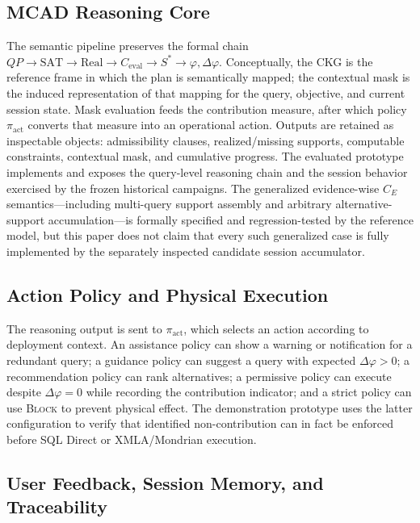\documentclass[journal]{IEEEtran}
\begin{document}
\subsection{MCAD Reasoning Core}

The semantic pipeline preserves the formal chain $QP\rightarrow\mathrm{SAT}\rightarrow\mathrm{Real}\rightarrow C_{\mathrm{eval}}\rightarrow S^*\rightarrow\varphi,\Delta\varphi$. Conceptually, the CKG is the reference frame in which the plan is semantically mapped; the contextual mask is the induced representation of that mapping for the query, objective, and current session state. Mask evaluation feeds the contribution measure, after which policy $\pi_{\mathrm{act}}$ converts that measure into an operational action. Outputs are retained as inspectable objects: admissibility clauses, realized/missing supports, computable constraints, contextual mask, and cumulative progress. The evaluated prototype implements and exposes the query-level reasoning chain and the session behavior exercised by the frozen historical campaigns. The generalized evidence-wise $C_E$ semantics---including multi-query support assembly and arbitrary alternative-support accumulation---is formally specified and regression-tested by the reference model, but this paper does not claim that every such generalized case is fully implemented by the separately inspected candidate session accumulator.



\subsection{Action Policy and Physical Execution}

The reasoning output is sent to $\pi_{\mathrm{act}}$, which selects an action according to deployment context. An assistance policy can show a warning or notification for a redundant query; a guidance policy can suggest a query with expected $\Delta\varphi>0$; a recommendation policy can rank alternatives; a permissive policy can execute despite $\Delta\varphi=0$ while recording the contribution indicator; and a strict policy can use \textsc{Block} to prevent physical effect. The demonstration prototype uses the latter configuration to verify that identified non-contribution can in fact be enforced before SQL Direct or XMLA/Mondrian execution.

\subsection{User Feedback, Session Memory, and Traceability}
\end{document}
